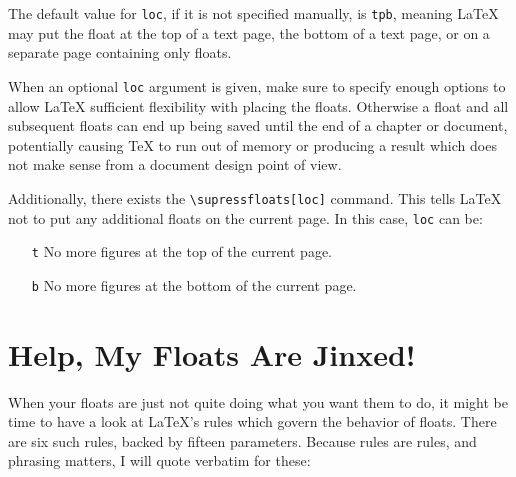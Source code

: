 \documentclass[article,a4paper,oneside,10pt]{memoir}
\newcommand\code[1]{\texttt{#1}}
\begin{document}
The  default  value for  \code{loc},  if  it  is  not specified  manually,  is
\code{tpb}, meaning \LaTeX{} may put the float  at the top of a text page, the
bottom of a text page, or on a separate page containing only floats.

When  an  optional  \code{loc}  argument   is  given,  make  sure  to  specify
enough  options to  allow  \LaTeX{} sufficient  flexibility  with placing  the
floats. Otherwise a  float and all  subsequent floats  can end up  being saved
until the end of a chapter or  document, potentially causing \TeX{} to run out
of memory  or producing  a result which  does not make  sense from  a document
design point of view.

Additionally, there exists  the \verb|\supressfloats[loc]| command. This tells
\LaTeX{} not to  put any additional floats on the  current page. In this case,
\code{loc} can be:

\begin{itemize}
    \item [\code{t}] No more figures at the top of the current page.
    \item [\code{b}] No more figures at the bottom of the current page.
\end{itemize}


\chapter{Help, My Floats Are Jinxed!}
\label{chap:jinxed}

When your floats are  just not quite doing what you want them  to do, it might
be time to have a look at  \LaTeX's rules which govern the behavior of floats.
There are  six such  rules, backed  by fifteen  parameters. Because  rules are
rules, and phrasing matters, I will quote \cite{lamport} verbatim for these:
\end{document}
